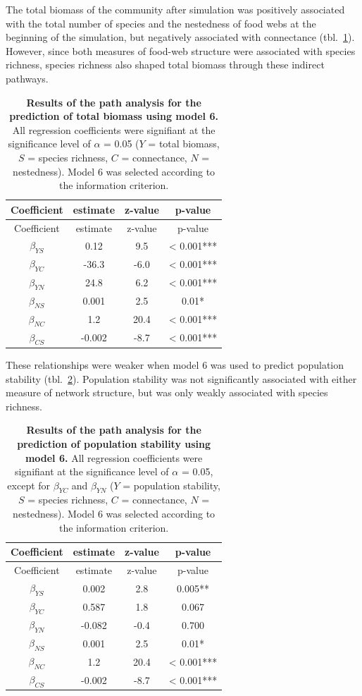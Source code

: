 \documentclass[11pt]{article}
\begin{document}
The total biomass of the community after simulation was positively
associated with the total number of species and the nestedness of food
webs at the beginning of the simulation, but negatively associated with
connectance (tbl.~\ref{tbl:path_biomass}). However, since both measures
of food-web structure were associated with species richness, species
richness also shaped total biomass through these indirect pathways.

\hypertarget{tbl:path_biomass}{}
\begin{longtable}[]{@{}cccc@{}}
\caption{\label{tbl:path_biomass}\textbf{Results of the path analysis
for the prediction of total biomass using model 6.} All regression
coefficients were signifiant at the significance level of \(\alpha\) =
0.05 (\(Y\) = total biomass, \(S\) = species richness, \(C\) =
connectance, \(N\) = nestedness). Model 6 was selected according to the
information criterion.}\tabularnewline
\toprule
Coefficient & estimate & z-value & p-value\tabularnewline
\midrule
\endfirsthead
\toprule
Coefficient & estimate & z-value & p-value\tabularnewline
\midrule
\endhead
\(\beta_{YS}\) & 0.12 & 9.5 & \textless{} 0.001***\tabularnewline
\(\beta_{YC}\) & -36.3 & -6.0 & \textless{} 0.001***\tabularnewline
\(\beta_{YN}\) & 24.8 & 6.2 & \textless{} 0.001***\tabularnewline
\(\beta_{NS}\) & 0.001 & 2.5 & 0.01*\tabularnewline
\(\beta_{NC}\) & 1.2 & 20.4 & \textless{} 0.001***\tabularnewline
\(\beta_{CS}\) & -0.002 & -8.7 & \textless{} 0.001***\tabularnewline
\bottomrule
\end{longtable}

These relationships were weaker when model 6 was used to predict
population stability (tbl.~\ref{tbl:path_stability}). Population
stability was not significantly associated with either measure of
network structure, but was only weakly associated with species richness.

\hypertarget{tbl:path_stability}{}
\begin{longtable}[]{@{}cccc@{}}
\caption{\label{tbl:path_stability}\textbf{Results of the path analysis
for the prediction of population stability using model 6.} All
regression coefficients were signifiant at the significance level of
\(\alpha\) = 0.05, except for \(\beta_{YC}\) and \(\beta_{YN}\) (\(Y\) =
population stability, \(S\) = species richness, \(C\) = connectance,
\(N\) = nestedness). Model 6 was selected according to the information
criterion.}\tabularnewline
\toprule
Coefficient & estimate & z-value & p-value\tabularnewline
\midrule
\endfirsthead
\toprule
Coefficient & estimate & z-value & p-value\tabularnewline
\midrule
\endhead
\(\beta_{YS}\) & 0.002 & 2.8 & 0.005**\tabularnewline
\(\beta_{YC}\) & 0.587 & 1.8 & 0.067\tabularnewline
\(\beta_{YN}\) & -0.082 & -0.4 & 0.700\tabularnewline
\(\beta_{NS}\) & 0.001 & 2.5 & 0.01*\tabularnewline
\(\beta_{NC}\) & 1.2 & 20.4 & \textless{} 0.001***\tabularnewline
\(\beta_{CS}\) & -0.002 & -8.7 & \textless{} 0.001***\tabularnewline
\bottomrule
\end{longtable}
\end{document}
